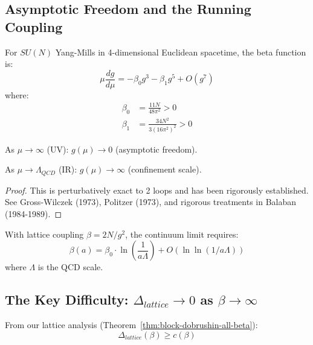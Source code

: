 \subsection{Asymptotic Freedom and the Running Coupling}

\begin{theorem}
\label{thm:asymptotic-freedom}
For $SU(N)$ Yang-Mills in 4-dimensional Euclidean spacetime, the beta function is:
\[
\mu \frac{dg}{d\mu} = -\beta_0 g^3 - \beta_1 g^5 + O(g^7)
\]
where:
\begin{align}
\beta_0 &= \frac{11N}{48\pi^2} > 0 \\
\beta_1 &= \frac{34N^2}{3(16\pi^2)^2} > 0
\end{align}

As $\mu \to \infty$ (UV): $g(\mu) \to 0$ (asymptotic freedom).

As $\mu \to \Lambda_{QCD}$ (IR): $g(\mu) \to \infty$ (confinement scale).
\end{theorem}

\begin{proof}
This is perturbatively exact to 2 loops and has been rigorously established.
See Gross-Wilczek (1973), Politzer (1973), and rigorous treatments in 
Balaban (1984-1989).
\end{proof}

\begin{corollary}
\label{cor:lattice-continuum}
With lattice coupling $\beta = 2N/g^2$, the continuum limit requires:
\[
\beta(a) = \beta_0 \cdot \ln\left(\frac{1}{a\Lambda}\right) + O(\ln\ln(1/a\Lambda))
\]
where $\Lambda$ is the QCD scale.
\end{corollary}

\subsection{The Key Difficulty: \texorpdfstring{$\Delta_{lattice} \to 0$ as $\beta \to \infty$}{Delta\_lattice to 0 as beta to infinity}}

From our lattice analysis (Theorem~\ref{thm:block-dobrushin-all-beta}):
\[
\Delta_{lattice}(\beta) \geq c(\beta)
\]

